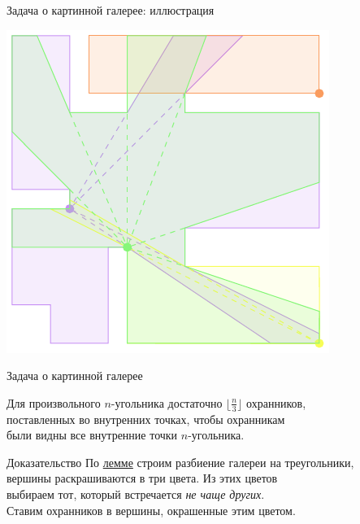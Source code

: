     \begin{frame}{Задача о картинной галерее: иллюстрация}
\begin{center}
  \includegraphics[height=0.84\textheight]{svg/pictGallery}
\end{center}
    \end{frame}

    \begin{frame}{Задача о картинной галерее}
        
        \vspace{2mm}
        \begin{thm}[Хватал]
		Для произвольного $n$-угольника
		достаточно $\lfloor \frac{n}{3} \rfloor$ охранников,\\
		поставленных во внутренних точках, чтобы охранникам\\
		были видны все внутренние точки $n$-угольника.
        \end{thm}

        \begin{block}{Доказательство}
		По \hyperlink{trianglemm}{лемме} строим разбиение
		галереи на треугольники,\\
		вершины раскрашиваются в три цвета. Из этих цветов\\
		выбираем тот, который встречается \emph{не чаще других}.\\
		Ставим охранников в вершины, окрашенные этим цветом.
        \end{block}
    \end{frame}
